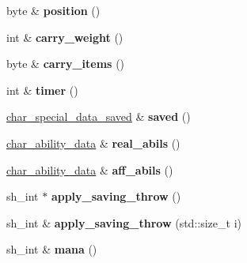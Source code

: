 \begin{DoxyCompactItemize}
\item 
\mbox{\label{classmods_1_1player_a7e952ee04a1638b1cb2a5f38005902e4}} 
byte \& {\bfseries position} ()
\item 
\mbox{\label{classmods_1_1player_a2d696a05cbf566e911278d95c135ba29}} 
int \& {\bfseries carry\+\_\+weight} ()
\item 
\mbox{\label{classmods_1_1player_af5a877d3f2e6b1836c3c94376f45979d}} 
byte \& {\bfseries carry\+\_\+items} ()
\item 
\mbox{\label{classmods_1_1player_aa2d14ebf63acd47608dc8a16f7583bfc}} 
int \& {\bfseries timer} ()
\item 
\mbox{\label{classmods_1_1player_a065c1230541587b765473cce38ed1e2a}} 
\hyperlink{structchar__special__data__saved}{char\+\_\+special\+\_\+data\+\_\+saved} \& {\bfseries saved} ()
\item 
\mbox{\label{classmods_1_1player_a903ea280b7c1f302e8c20fa57f083491}} 
\hyperlink{structchar__ability__data}{char\+\_\+ability\+\_\+data} \& {\bfseries real\+\_\+abils} ()
\item 
\mbox{\label{classmods_1_1player_a731c700fbab5bdad7fcfae91ac7f2dfa}} 
\hyperlink{structchar__ability__data}{char\+\_\+ability\+\_\+data} \& {\bfseries aff\+\_\+abils} ()
\item 
\mbox{\label{classmods_1_1player_adc14f7e744c36babaa310a9fb8bc80cc}} 
sh\+\_\+int $\ast$ {\bfseries apply\+\_\+saving\+\_\+throw} ()
\item 
\mbox{\label{classmods_1_1player_a11caa47a8e358d00972fb7cf2f6c7b6d}} 
sh\+\_\+int \& {\bfseries apply\+\_\+saving\+\_\+throw} (std\+::size\+\_\+t i)
\item 
\mbox{\label{classmods_1_1player_a51c04c6fbc693242bff75b4c5f7a6f20}} 
sh\+\_\+int \& {\bfseries mana} ()
\item 
\mbox{\label{classmods_1_1player_a5f33702911d5388a841c18fea85fc1f4}} 

\end{DoxyCompactItemize}
